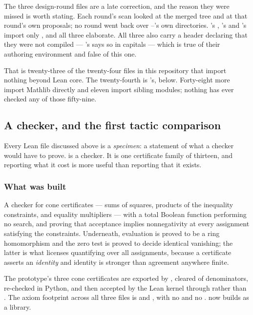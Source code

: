 The three design-round files are a late correction, and the reason they were
missed is worth stating. Each round's scan looked at the merged tree and at
that round's own proposals; no round went back over --'s own
 directories. 's , 's
 and 's  import only
, and all three elaborate. All three also carry a header declaring
that they were not compiled --- 's says so in capitals --- which is
true of their authoring environment and false of this one.

That is twenty-three of the twenty-four files in this repository that import
nothing beyond Lean core. The twenty-fourth is 's, below. Forty-eight
more import Mathlib directly and eleven import sibling modules; nothing has
ever checked any of those fifty-nine.

\subsection{A checker, and the first tactic comparison}

Every Lean file discussed above is a \emph{specimen}: a statement of what a
checker would have to prove.  is a checker. It is one
certificate family of thirteen, and reporting what it cost is more useful than
reporting that it exists.

\subsubsection*{What was built}

A checker for cone certificates --- sums of squares, products of the inequality
constraints, and equality multipliers --- with  a total
Boolean function performing no search, and  proving that
acceptance implies nonnegativity at every assignment satisfying the
constraints. Underneath, evaluation is proved to be a ring homomorphism and the
zero test is proved to decide identical vanishing; the latter is what licenses
quantifying over all assignments, because a certificate asserts an
\emph{identity} and identity is stronger than agreement anywhere finite.

The prototype's three cone certificates are exported by
, cleared of denominators, re-checked in
Python, and then accepted by the Lean kernel through  rather than
. The axiom footprint across all three files is
 and , with no  and no
.  now builds as a library.

